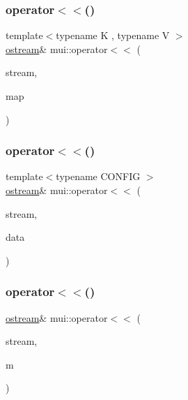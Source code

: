 \mbox{\label{namespacemui_a79f363b28a0f784719203d0c5be85201}} 
\subsubsection{\texorpdfstring{operator$<$$<$()}{operator<<()}\hspace{0.1cm}{\footnotesize\ttfamily [8/21]}}
{\footnotesize\ttfamily template$<$typename K , typename V $>$ \\
\hyperlink{classmui_1_1ostream}{ostream}\& mui\+::operator$<$$<$ (\begin{DoxyParamCaption}\item[{\hyperlink{classmui_1_1ostream}{ostream} \&}]{stream,  }\item[{const std\+::unordered\+\_\+multimap$<$ K, V $>$ \&}]{map }\end{DoxyParamCaption})\hspace{0.3cm}{\ttfamily [inline]}}

\mbox{\label{namespacemui_af0615fca077c7374e53a2421cb7296f3}} 
\subsubsection{\texorpdfstring{operator$<$$<$()}{operator<<()}\hspace{0.1cm}{\footnotesize\ttfamily [9/21]}}
{\footnotesize\ttfamily template$<$typename C\+O\+N\+F\+IG $>$ \\
\hyperlink{classmui_1_1ostream}{ostream}\& mui\+::operator$<$$<$ (\begin{DoxyParamCaption}\item[{\hyperlink{classmui_1_1ostream}{ostream} \&}]{stream,  }\item[{const \hyperlink{classmui_1_1span}{span}$<$ C\+O\+N\+F\+IG $>$ \&}]{data }\end{DoxyParamCaption})}

\mbox{\label{namespacemui_a31a6e16316f20c68b388076995a6c47c}} 
\subsubsection{\texorpdfstring{operator$<$$<$()}{operator<<()}\hspace{0.1cm}{\footnotesize\ttfamily [10/21]}}
{\footnotesize\ttfamily \hyperlink{classmui_1_1ostream}{ostream}\& mui\+::operator$<$$<$ (\begin{DoxyParamCaption}\item[{\hyperlink{classmui_1_1ostream}{ostream} \&}]{stream,  }\item[{const \hyperlink{structmui_1_1message}{message} \&}]{m }\end{DoxyParamCaption})\hspace{0.3cm}{\ttfamily [inline]}}

